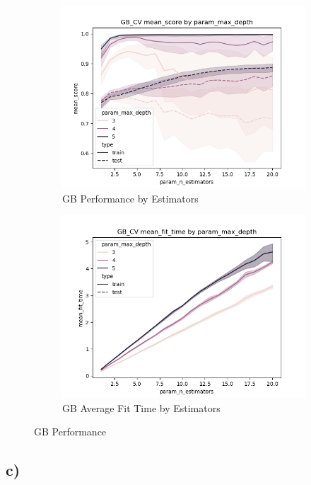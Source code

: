 \documentclass[12pt]{article}
\begin{document}
\begin{figure}
\begin{subfigure}{.5\textwidth}
    \includegraphics[width=.95\textwidth]{../results5/gb_cv/param_max_depth_mean_score_param_n_estimators.png}
    \caption{GB Performance by Estimators}
    \end{subfigure}%
  \begin{subfigure}{.5\textwidth}
    \includegraphics[width=.95\textwidth]{../results5/gb_cv/param_max_depth_mean_fit_time_param_n_estimators.png}
    \caption{GB Average Fit Time by Estimators}
  \end{subfigure}
  \caption{GB Performance}
  \label{figure5}
\end{figure}

\subsection{c)}
\end{document}
